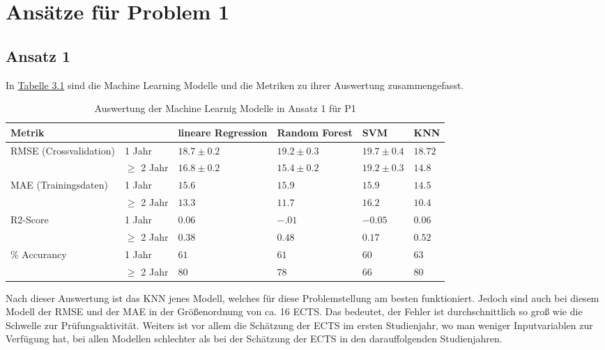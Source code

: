 

\section{Ans\"atze f\"ur Problem 1}


\subsection{Ansatz 1}
In \hyperref[tab:ergebnisA1P1]{Tabelle 3.1} sind die Machine Learning Modelle und die Metriken zu ihrer Auswertung zusammengefasst. 

\begin{table}[ht]
  \caption{\label{tab:ergebnisA1P1} Auswertung der Machine Learnig Modelle in Ansatz 1 f\"ur P1}
  \begin{tabular}{ p{3cm} p{2cm} p{2cm} p{2cm} p{2cm} p{1.5cm} }
    \toprule
    Metrik & & lineare Regression & Random Forest & SVM & KNN \\
    \midrule
    \multirow{2}{3em}{RMSE (Crossvalidation)} 
    & 1 Jahr & $18.7 \pm 0.2$ & $19.2 \pm 0.3$ & $19.7 \pm 0.4$ & $18.72$  \\
    & $\geq$ 2 Jahr & $16.8 \pm 0.2$& $15.4 \pm 0.2$ & $19.2 \pm 0.3$ & $14.8$   \\
    
    \midrule
    \multirow{2}{3em}{MAE (Trainingsdaten)} 
    & 1 Jahr & $15.6$ & $15.9$ & $15.9$ & $14.5$ \\
    & $\geq$ 2 Jahr & $13.3$ & $11.7$ & $16.2$ & $10.4$ \\
    
    \midrule
    \multirow{2}{3em}{R2-Score} 
    & 1 Jahr & $0.06$ & $-.01$ & $-0.05$ & $0.06$  \\
    & $\geq$ 2 Jahr & $0.38$ & $0.48$  & $0.17$ & $0.52$   \\
   
    \midrule
    \multirow{2}{3em}{$\%$ Accurancy} 
    & 1 Jahr & $61$ & $61$ & $60$ & $63$  \\
    & $\geq$ 2 Jahr & $80$ & $78$ & $66$ & $80$   \\
    
    \bottomrule
    
  \end{tabular}
  
\end{table}

\noindent Nach dieser Auswertung ist das KNN jenes Modell, welches f\"ur diese Problemstellung am besten funktioniert. Jedoch sind auch bei diesem Modell der 
RMSE und der MAE in der Gr\"o{\ss}enordnung von ca. 16 ECTS. Das bedeutet, der Fehler ist durchschnittlich so gro{\ss} wie die Schwelle zur Pr\"ufungsaktivit\"at.
Weiters ist vor allem die Sch\"atzung der ECTS im ersten Studienjahr, wo man weniger Inputvariablen zur Verf\"ugung hat, bei allen Modellen schlechter als bei der 
Sch\"atzung der ECTS in den darauffolgenden Studienjahren. \\

